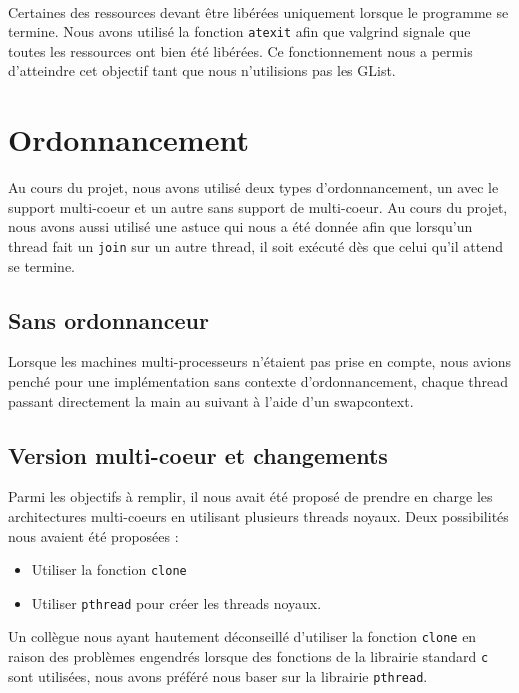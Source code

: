 \documentclass{article}
\begin{document}
            \paragraph{}
            Certaines des ressources devant être libérées uniquement lorsque
            le programme se termine. Nous avons utilisé la fonction
            \verb!atexit! afin que valgrind signale que toutes les
            ressources ont bien été libérées. Ce fonctionnement nous a permis
            d'atteindre cet objectif tant que nous n'utilisions pas les
            GList.
		

	\section{Ordonnancement}
    Au cours du projet, nous avons utilisé deux types d'ordonnancement, un
    avec le support multi-coeur et un autre sans support de multi-coeur. Au
    cours du projet, nous avons aussi utilisé une astuce qui nous a été
    donnée afin que lorsqu'un thread fait un \verb!join! sur un autre
    thread, il soit exécuté dès que celui qu'il attend se termine.

		\subsection{Sans ordonnanceur}
        Lorsque les machines multi-processeurs n'étaient pas prise en compte,
        nous avions penché pour une implémentation sans contexte
        d'ordonnancement, chaque thread passant directement la main au
        suivant à l'aide d'un swapcontext.\\

		\subsection{Version multi-coeur et changements}
		Parmi les objectifs à remplir, il nous avait été proposé de prendre
        en charge les architectures multi-coeurs en utilisant plusieurs
        threads noyaux. Deux possibilités nous avaient été proposées :
        \begin{itemize}
          \item Utiliser la fonction \verb!clone!
          \item Utiliser \verb!pthread! pour créer les threads noyaux.
        \end{itemize}
        Un collègue nous ayant hautement déconseillé d'utiliser la fonction
        \verb!clone! en raison des problèmes engendrés lorsque des fonctions
        de la librairie standard \verb!c! sont utilisées, nous avons préféré
        nous baser sur la librairie \verb!pthread!.
\end{document}
